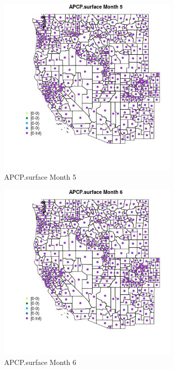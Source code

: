 \begin{figure} 
\centering  
\includegraphics[width=0.77\textwidth]{Code_Outputs/df_report_ML_predictors_CountyCentroid_Locations_Dates_2008-01-01to2018-12-31_MapObsMo5APCPsurface.jpg} 
\caption{\label{fig:df_report_ML_predictors_CountyCentroid_Locations_Dates_2008-01-01to2018-12-31MapObsMo5APCPsurface}APCP.surface Month 5} 
\end{figure} 
 

\begin{figure} 
\centering  
\includegraphics[width=0.77\textwidth]{Code_Outputs/df_report_ML_predictors_CountyCentroid_Locations_Dates_2008-01-01to2018-12-31_MapObsMo6APCPsurface.jpg} 
\caption{\label{fig:df_report_ML_predictors_CountyCentroid_Locations_Dates_2008-01-01to2018-12-31MapObsMo6APCPsurface}APCP.surface Month 6} 
\end{figure} 
 

